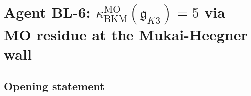 %
%
%
%
%

\chapter*{Agent BL-6:
          $\kappa_{\mathrm{BKM}}^{\mathrm{MO}}(\mathfrak g_{K3}) = 5$
          via MO residue at the Mukai-Heegner wall}

\section*{Opening statement}

